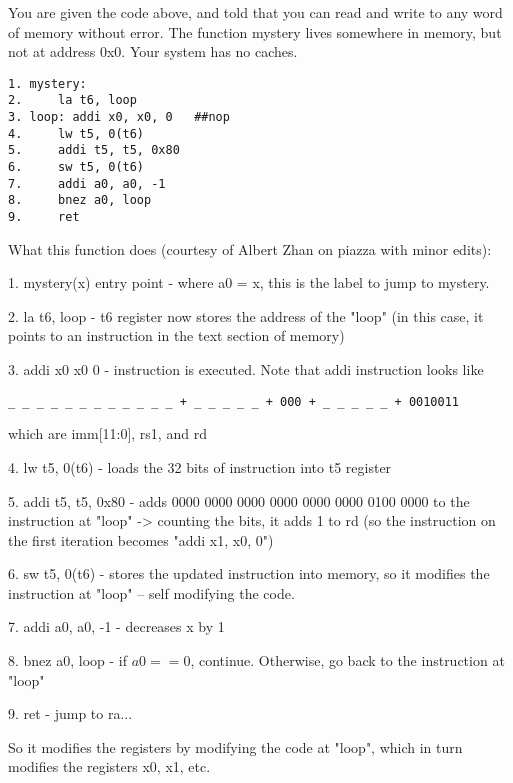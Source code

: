 \begin{blocksection}
\question You are given the code above, and told that you can read and write to any word of memory without error.
The function mystery lives somewhere in memory, but not at address 0x0. Your system has no caches.

\begin{verbatim}
1. mystery:
2.     la t6, loop
3. loop: addi x0, x0, 0   ##nop
4.     lw t5, 0(t6)
5.     addi t5, t5, 0x80
6.     sw t5, 0(t6)
7.     addi a0, a0, -1
8.     bnez a0, loop
9.     ret

\end{verbatim}

\end{blocksection}

\begin{blocksection}

\begin{solution}[0.5in]
What this function does (courtesy of Albert Zhan on piazza with minor edits):

1. mystery(x) entry point - where a0 = x, this is the label to jump to mystery.

2. la t6, loop - t6 register now stores the address of the "loop" (in this case, it points to an instruction in the text section of memory)

3. addi x0 x0 0 - instruction is executed. Note that addi instruction looks like 
\begin{verbatim}
_ _ _ _ _ _ _ _ _ _ _ _ + _ _ _ _ _ + 000 + _ _ _ _ _ + 0010011
\end{verbatim}
which are imm[11:0], rs1, and rd

4. lw t5, 0(t6) - loads the 32 bits of instruction into t5 register

5. addi t5, t5, 0x80 - adds 0000 0000 0000 0000 0000 0000 0100 0000 to the instruction at "loop" -> counting the bits, it adds 1 to rd (so the instruction on the first iteration becomes "addi x1, x0, 0")

6. sw t5, 0(t6) - stores the updated instruction into memory, so it modifies the instruction at "loop" -- self modifying the code.

7. addi a0, a0, -1 - decreases x by 1

8. bnez a0, loop - if $a0 == 0$, continue. Otherwise, go back to the instruction at "loop"

9. ret - jump to ra...

So it modifies the registers by modifying the code at "loop", which in turn modifies the registers x0, x1, etc.
\end{solution}
\end{blocksection}

